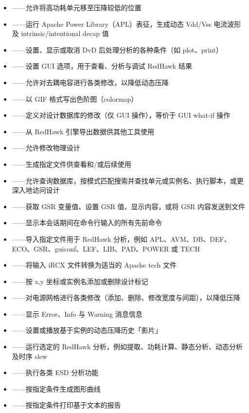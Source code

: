 \begin{itemize}
  \item {}——允许将高功耗单元移至压降较低的位置
  \item {}——运行 Apache Power Library（APL）表征，生成动态 Vdd/Vss 电流波形及 intrinsic/intentional decap 值
  \item {}——设置、显示或取消 DvD 后处理分析的各种条件（如 plot、print）
  \item {}——设置 GUI 选项，用于查看、分析与调试 RedHawk 结果
  \item {}——允许对去耦电容进行各类修改，以降低动态压降
  \item {}——以 GIF 格式写出色阶图（colormap）
  \item {}——定义对设计数据库的修改（仅 GUI 操作），等价于 GUI what-if 操作
  \item {}——从 RedHawk 引擎导出数据供其他工具使用
  \item {}——允许修改物理设计
  \item {}——生成指定文件供查看和/或后续使用
  \item {}——允许查询数据库，按模式匹配搜索并查找单元或实例名、执行脚本，或更深入地访问设计
  \item {}——获取 GSR 变量值、设置 GSR 值、显示内容，或将 GSR 内容发送到文件
  \item {}——显示本会话期间在命令行输入的所有先前命令
  \item {}——导入指定文件用于 RedHawk 分析，例如 APL、AVM、DB、DEF、ECO、GSR、guiconf、LEF、LIB、PAD、POWER 或 TECH
  \item {}——将输入 iRCX 文件转换为适当的 Apache tech 文件
  \item {}——按 x,y 坐标或实例名添加或删除设计标记
  \item {}——对电源网格进行各类修改（添加、删除、修改宽度与间距），以降低压降
  \item {}——显示 Error、Info 与 Warning 消息信息
  \item {}——设置或播放基于实例的动态压降历史「影片」
  \item {}——运行选定的 RedHawk 分析，例如提取、功耗计算、静态分析、动态分析及时序 slew
  \item {}——执行各类 ESD 分析功能
  \item {}——按指定条件生成图形曲线
  \item {}——按指定条件打印基于文本的报告

\end{itemize}
